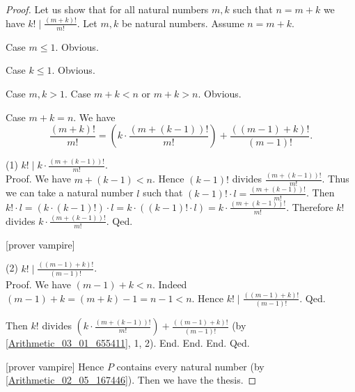 \documentclass[../../arithmetic.ftl.tex]{subfiles}
\begin{document}
\begin{forthel}
\begin{proof}
        Let us show that for all natural numbers $m,k$ such that $n = m + k$ we have $k! \mid \frac{(m + k)!}{m!}$.
          Let $m,k$ be natural numbers.
          Assume $n = m + k$.

          Case $m \leq 1$. Obvious.

          Case $k \leq 1$. Obvious.

          Case $m,k > 1$.
            Case $m + k < n$ or $m + k > n$. Obvious.

            Case $m + k = n$.
              We have \[ \frac{(m + k)!}{m!} = (k \cdot \frac{(m + (k - 1))!}{m!}) + \frac{((m - 1) + k)!}{(m - 1)!}. \]

              (1) $k! \mid k \cdot \frac{(m + (k - 1))!}{m!}$. \\
              Proof.
                We have $m + (k - 1) < n$.
                Hence $(k - 1)!$ divides $\frac{(m + (k - 1))!}{m!}$.
                Thus we can take a natural number $l$ such that $(k - 1)! \cdot l = \frac{(m + (k - 1))!}{m!}$.
                Then $k! \cdot l = (k \cdot (k - 1)!) \cdot l = k \cdot ((k - 1)! \cdot l) = k \cdot \frac{(m + (k - 1))!}{m!}$.
                Therefore $k!$ divides $k \cdot \frac{(m + (k - 1))!}{m!}$.
              Qed.

              [prover vampire]

              (2) $k! \mid \frac{((m - 1) + k)!}{(m - 1)!}$. \\
              Proof.
                We have $(m - 1) + k < n$.
                Indeed $(m - 1) + k = (m + k) - 1 = n - 1 < n$.
                Hence $k! \mid \frac{((m - 1) + k)!}{(m - 1)!}$.
              Qed.

              Then $k!$ divides $(k \cdot \frac{(m + (k - 1))!}{m!}) + \frac{((m - 1) + k)!}{(m - 1)!}$ (by \ref{Arithmetic_03_01_655411}, 1, 2).
            End.
          End.
        End.
      Qed.

      [prover vampire]
      Hence $P$ contains every natural number (by \ref{Arithmetic_02_05_167446}).
      Then we have the thesis.
    \end{proof}
  \end{forthel}
\end{document}
